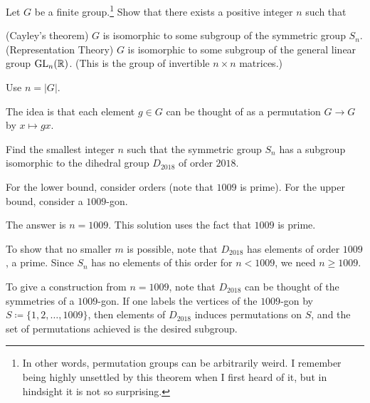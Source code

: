 \begin{dproblem}
	\onechili
	Let $G$ be a finite group.\footnote{In other words,
		permutation groups can be arbitrarily weird.
		I remember being highly unsettled by this theorem when I first heard of it,
		but in hindsight it is not so surprising.}
	Show that there exists a positive integer $n$ such that
	\begin{enumerate}[(a)]
		\ii (Cayley's theorem) $G$ is isomorphic to some subgroup of the symmetric group $S_n$.
		\ii (Representation Theory) $G$ is isomorphic to some subgroup of
		the general linear group $\operatorname{GL}_n(\mathbb R)$.
		(This is the group of invertible $n \times n$ matrices.)
	\end{enumerate}
	\label{thm:cayley_theorem}
	\begin{hint}
		Use $n = \left\lvert G \right\rvert$.
	\end{hint}
	\begin{sol}
		The idea is that each element $g \in G$ can be thought of as a permutation
		$G \to G$ by $x \mapsto gx$.
	\end{sol}
\end{dproblem}

\begin{problem}
	\onechili
	Find the smallest integer $n$
	such that the symmetric group $S_n$ has a subgroup
	isomorphic to the dihedral group $D_{2018}$ of order $2018$.
	\begin{hint}
		For the lower bound, consider orders (note that $1009$ is prime).
		For the upper bound, consider a $1009$-gon.
	\end{hint}
	\begin{sol}
		The answer is $n = 1009$.
		This solution uses the fact that $1009$ is prime.

		To show that no smaller $m$ is possible,
		note that $D_{2018}$ has elements of order $1009$, a prime.
		Since $S_n$ has no elements of this order for $n < 1009$, we need $n \ge 1009$.

		To give a construction from $n = 1009$,
		note that $D_{2018}$ can be thought of the symmetries of a $1009$-gon.
		If one labels the vertices of the $1009$-gon by $S \coloneqq \{1,2,\dots,1009\}$,
		then elements of $D_{2018}$ induces permutations on $S$,
		and the set of permutations achieved is the desired subgroup.
	\end{sol}
\end{problem}

